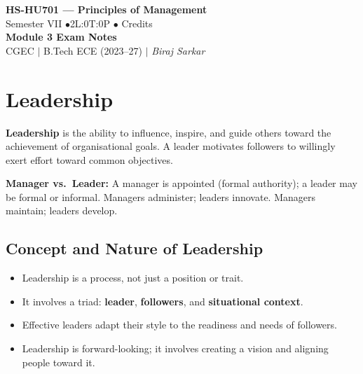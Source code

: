 \documentclass[12pt,a4paper]{article}
\begin{document}

\begin{center}
  {\LARGE\bfseries\color{myred} HS-HU701 --- Principles of Management}\\[5pt]
  {\normalsize\color{mydark} Semester VII \quad$\bullet$\quad 2L:0T:0P \quad$\bullet$ Credits}\\[3pt]
  {\normalsize\color{myteal}\textbf{Module 3 Exam Notes}}\\[3pt]
  {\small\color{mydark} CGEC \;$|$\; B.Tech ECE (2023--27) \;$|$\; \textit{Biraj Sarkar}}
\end{center}
\vspace{2pt}
\noindent{\color{myred}\rule{\linewidth}{1.5pt}}
\vspace{2pt}

\hypersetup{linkcolor=mydark}
\tableofcontents
\hypersetup{linkcolor=myteal}
\newpage

\section{Leadership}

\begin{tcolorbox}[defbox, title={\textbf{Leadership --- Definition}}]
\textbf{Leadership} is the ability to influence, inspire, and guide others toward the achievement of organisational goals. A leader motivates followers to willingly exert effort toward common objectives.
\par\vspace{3pt}
\textbf{Manager vs.\ Leader:} A manager is appointed (formal authority); a leader may be formal or informal. Managers administer; leaders innovate. Managers maintain; leaders develop.
\end{tcolorbox}

\subsection{Concept and Nature of Leadership}
\begin{itemize}[leftmargin=*, itemsep=3pt]
  \item Leadership is a process, not just a position or trait.
  \item It involves a triad: \textbf{leader}, \textbf{followers}, and \textbf{situational context}.
  \item Effective leaders adapt their style to the readiness and needs of followers.
  \item Leadership is forward-looking; it involves creating a vision and aligning people toward it.
\end{itemize}
\end{document}

